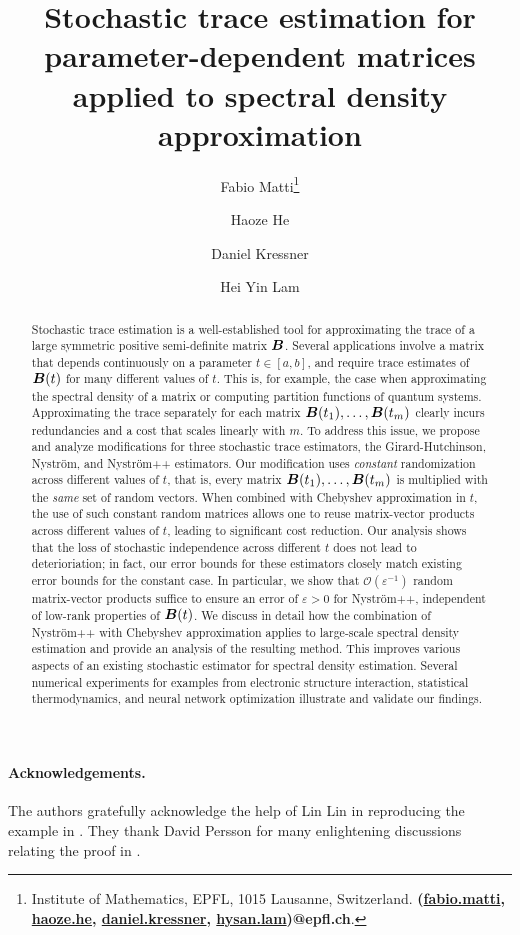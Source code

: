 \documentclass[11pt]{article}
\title{Stochastic trace estimation for parameter-dependent matrices applied to spectral density approximation}
\author{Fabio Matti\thanks{Institute of Mathematics, EPFL, 1015 Lausanne, Switzerland. {\textbf{(\href{mailto:fabio.matti@epfl.ch}{fabio.matti}, \href{mailto:haoze.he@epfl.ch}{haoze.he}, \href{mailto:daniel.kressner@epfl.ch}{daniel.kressner}, \href{mailto:hysan.lam@epfl.ch}{hysan.lam})@epfl.ch}}.}
\and Haoze He\footnotemark[1]
\and Daniel Kressner\footnotemark[1]
\and Hei Yin Lam\footnotemark[1]}
\begin{document}
\maketitle

\begin{abstract}
    Stochastic trace estimation is a well-established tool for approximating the trace of a large symmetric positive semi-definite matrix $\boldsymbol{B}$. Several applications involve a matrix that depends continuously on a parameter $t \in [a,b]$, and require trace estimates of $\boldsymbol{B}(t)$ for many different values of $t$. This is, for example, the case when approximating the spectral density of a matrix or computing partition functions of quantum systems. Approximating the trace separately for each matrix
    $\boldsymbol{B}(t_1), \dots, \boldsymbol{B}(t_m)$ clearly incurs redundancies and a cost that scales linearly with $m$. To address this issue, we propose and analyze modifications for three stochastic trace estimators, the Girard-Hutchinson, Nyström, and Nyström++ estimators. Our modification uses \emph{constant} randomization across different values of $t$, that is,
    every matrix $\boldsymbol{B}(t_1), \dots, \boldsymbol{B}(t_m)$ is multiplied with the \emph{same} set of random vectors.
    When combined with Chebyshev approximation in $t$, the use of such constant random matrices allows one to reuse matrix-vector products across different values of $t$, leading to significant cost reduction.
    Our analysis shows that the loss of stochastic independence across different $t$ does not lead to deterioriation; in fact, our error bounds for these estimators closely match existing error bounds for the constant case. In particular, we show that $\mathcal{O}(\varepsilon^{-1})$ random matrix-vector products suffice to ensure an error of $\varepsilon > 0$ for Nyström++, independent of low-rank properties of $\boldsymbol{B}(t)$. We discuss in detail how the combination of Nyström++ with 
    Chebyshev approximation applies to large-scale spectral density estimation and provide an analysis of the resulting method. This  improves various aspects of an existing stochastic estimator for spectral density estimation. Several numerical experiments for examples from electronic structure interaction, statistical thermodynamics, and neural network optimization illustrate and validate our findings.
\end{abstract}







\paragraph{Acknowledgements.} The authors gratefully acknowledge the help of Lin Lin in reproducing the example in . They thank David Persson for many enlightening discussions relating the proof in .

\printbibliography


\end{document}
